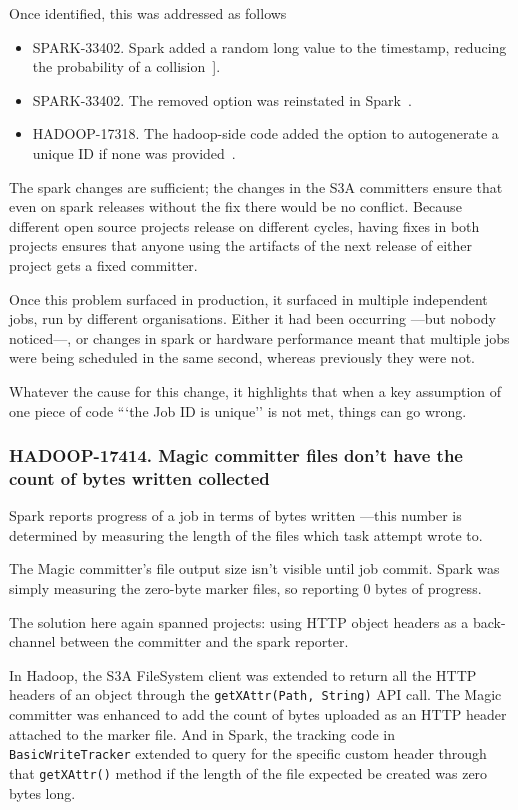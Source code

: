 \documentclass[conference]{IEEEtran}
\begin{document}
Once identified, this was addressed as follows
\begin{itemize}
    \item SPARK-33402. Spark added a random long value to the timestamp, reducing the probability of a collision\ \cite{SPARK-33402}].
    \item SPARK-33402. The removed option was reinstated in Spark\ \cite{SPARK-33230}.
    \item HADOOP-17318. The hadoop-side code added the option to autogenerate a unique ID if none was provided\ \cite{HADOOP-17318}.
\end{itemize}

The spark changes are sufficient;
the changes in the S3A committers ensure that even on spark releases without the fix there would be no conflict.
Because different open source projects release on different cycles, having fixes
in both projects ensures that anyone using the artifacts of the next release of either
project gets a fixed committer.

Once this problem surfaced in production, it surfaced in multiple independent
jobs, run by different organisations.
Either it had been occurring ---but nobody noticed---, or changes in spark or hardware performance
meant that multiple jobs were being scheduled in the same second, whereas previously they were not.

Whatever the cause for this change, it highlights that when a key assumption of one piece of code
```the Job ID is unique'' is not met, things can go wrong.


\subsubsection{HADOOP-17414. Magic committer files don't have the count of bytes written collected}

Spark reports progress of a job in terms of bytes written ---this number is determined by measuring the length of the files which task attempt wrote to.

The Magic committer's file output size isn't visible until job commit.
Spark was simply measuring the zero-byte marker files, so reporting 0 bytes of progress.

The solution here again spanned projects: using HTTP object headers as a back-channel between the committer and the spark reporter.
\ \cite{HADOOP-17414, SPARK-33739}

In Hadoop, the S3A FileSystem client was extended to return all the HTTP headers of an object through the \texttt{getXAttr(Path, String)} API call.
The Magic committer was enhanced to add the count of bytes uploaded as an HTTP header attached to the marker file.
And in Spark, the tracking code in \texttt{BasicWriteTracker} extended to query for the specific custom header through that \texttt{getXAttr()} method if the length of the file expected be created was zero bytes long.
\end{document}
